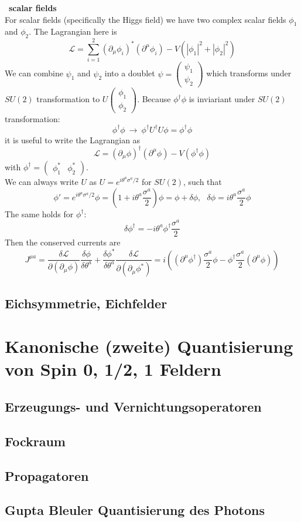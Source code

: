 \documentclass{include/thesisclass}
\newcommand{\LL}{\mathcal{L}}
\newcommand{\df}{\rightarrow}
\newcommand{\p}{\partial}
\newcommand{\vektorz}[2]{\begin{pmatrix} #1 \\ #2 \end{pmatrix}}
\newcommand{\sub}[1]{~\newline\newline\textbf{#1}\\}
\begin{document}
\sub{scalar fields}
For scalar fields (specifically the Higgs field) we have two complex scalar fields $\phi_1$ and $\phi_2$. The Lagrangian here is
\[ \LL = \sum_{i = 1}^2 ( \p _ \mu \phi_i)^*( \p^\mu \phi_i) - V( | \phi_1|^2+ | \phi_2|^2)\]
We can combine $\psi_1$ and $\psi_2$ into a doublet $\psi = \vektorz{\psi_1}{\psi_2}$ which transforms under $SU(2)$ transformation to $U \vektorz{\phi_1}{\phi_2}$. Because $\phi^\dagger \phi$ is inviariant under $SU(2)$ transformation:
\[ \phi^\dagger \phi ~\df ~ \phi^\dagger U ^\dagger U \phi = \phi^\dagger \phi\]
it is useful to write the Lagrangian as
\[ \LL = ( \p_\mu \phi)^\dagger ( \p^\mu \phi) - V( \phi^\dagger \phi)\]
with $ \phi^\dagger = \begin{pmatrix} \phi_1^* & \phi_2^*\end{pmatrix}$.\\
We can always write $U$ as $U = e^{i \theta^a \sigma^a/2}$ for $SU(2)$, such that 
\[ \phi' = e^{i \theta^a \sigma^a/2} \phi = \left( 1 + i \theta ^a \frac{\sigma^a}{2}\right) \phi = \phi + \delta \phi, ~~~\delta \phi = i \theta^a \frac{\sigma^a}{2} \phi\]
The same holds for $\phi^\dagger$:
\[ \delta \phi^\dagger = - i \theta^a \phi^\dagger \frac{\sigma^a}{2}\]
Then the conserved currents are
\[ J^{\mu a} = \frac{ \delta \LL}{\p ( \p_\mu \phi)} \frac{\delta \phi}{\delta \theta^a} + \frac{\delta \phi^*}{\delta \theta^a} \frac{\delta \LL}{\p ( \p_\mu \phi^*)} = i\left( ( \p^\mu \phi^\dagger) \frac{\sigma^a}{2} \phi - \phi^\dagger \frac{\sigma^a}{2} ( \p^\mu \phi) \right)  \]
\section{Eichsymmetrie, Eichfelder}

\chapter{Kanonische (zweite) Quantisierung von Spin 0, 1/2, 1 Feldern}
\section{Erzeugungs- und Vernichtungsoperatoren}
\section{Fockraum}
\section{Propagatoren}
\section{Gupta Bleuler Quantisierung des Photons}
\end{document}
